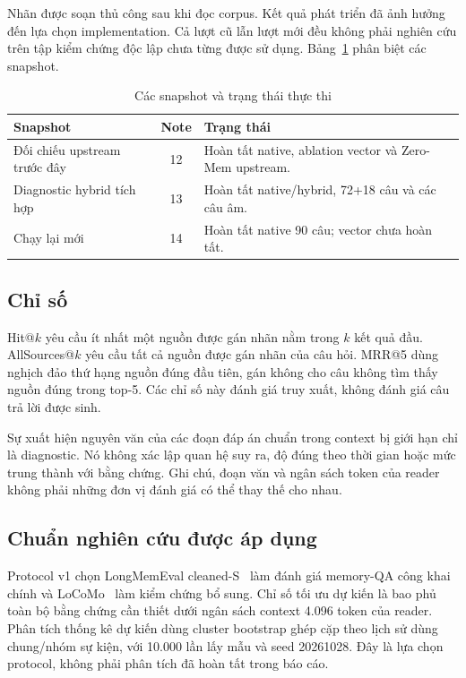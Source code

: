 \documentclass[conference]{IEEEtran}
\begin{document}
Nhãn được soạn thủ công sau khi đọc corpus. Kết quả phát triển đã ảnh hưởng đến lựa chọn implementation. Cả lượt cũ lẫn lượt mới đều không phải nghiên cứu trên tập kiểm chứng độc lập chưa từng được sử dụng. Bảng~\ref{tab:snapshots} phân biệt các snapshot.
\begin{table}[t]
\caption{Các snapshot và trạng thái thực thi}
\label{tab:snapshots}
\centering\small
\begin{tabularx}{\columnwidth}{@{}lcX@{}}
\toprule
Snapshot & Note & Trạng thái \\
\midrule
Đối chiếu upstream trước đây & 12 & Hoàn tất native, ablation vector và Zero-Mem upstream. \\
Diagnostic hybrid tích hợp & 13 & Hoàn tất native/hybrid, 72+18 câu và các câu âm. \\
Chạy lại mới & 14 & Hoàn tất native 90 câu; vector chưa hoàn tất. \\
\bottomrule
\end{tabularx}
\end{table}

\subsection{Chỉ số}
Hit@$k$ yêu cầu ít nhất một nguồn được gán nhãn nằm trong $k$ kết quả đầu. AllSources@$k$ yêu cầu tất cả nguồn được gán nhãn của câu hỏi. MRR@5 dùng nghịch đảo thứ hạng nguồn đúng đầu tiên, gán không cho câu không tìm thấy nguồn đúng trong top-5. Các chỉ số này đánh giá truy xuất, không đánh giá câu trả lời được sinh.

Sự xuất hiện nguyên văn của các đoạn đáp án chuẩn trong context bị giới hạn chỉ là diagnostic. Nó không xác lập quan hệ suy ra, độ đúng theo thời gian hoặc mức trung thành với bằng chứng. Ghi chú, đoạn văn và ngân sách token của reader không phải những đơn vị đánh giá có thể thay thế cho nhau.

\subsection{Chuẩn nghiên cứu được áp dụng}
Protocol v1 chọn LongMemEval cleaned-S~\cite{longmem} làm đánh giá memory-QA công khai chính và LoCoMo~\cite{locomo} làm kiểm chứng bổ sung. Chỉ số tối ưu dự kiến là bao phủ toàn bộ bằng chứng cần thiết dưới ngân sách context 4.096 token của reader. Phân tích thống kê dự kiến dùng cluster bootstrap ghép cặp theo lịch sử dùng chung/nhóm sự kiện, với 10.000 lần lấy mẫu và seed 20261028. Đây là lựa chọn protocol, không phải phân tích đã hoàn tất trong báo cáo.
\end{document}
